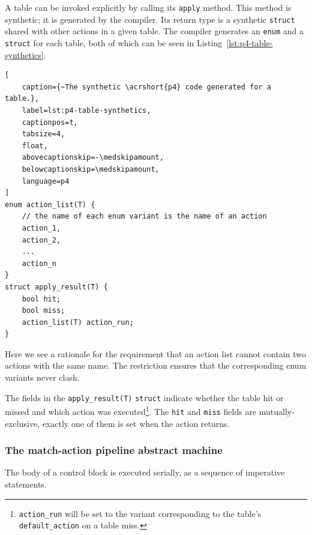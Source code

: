 A table can be invoked explicitly by calling its \texttt{apply} method. This
method is synthetic; it is generated by the compiler. Its return type is a
synthetic \texttt{struct} shared with other actions in a given table. The
compiler generates an \texttt{enum} and a \texttt{struct} for each table, both
of which can be seen in Listing~\ref{lst:p4-table-synthetics}.

\begin{lstlisting}[
	caption={~The synthetic \acrshort{p4} code generated for a table.},
	label=lst:p4-table-synthetics,
	captionpos=t,
	tabsize=4,
	float,
	abovecaptionskip=-\medskipamount,
	belowcaptionskip=\medskipamount,
	language=p4
]
enum action_list(T) {
	// the name of each enum variant is the name of an action
	action_1,
	action_2,
	...
	action_n
}
struct apply_result(T) {
	bool hit;
	bool miss;
	action_list(T) action_run;
}
\end{lstlisting}

Here we see a rationale for the requirement that an action list cannot contain
two actions with the same name. The restriction ensures that the corresponding
enum variants never clash.

The fields in the \texttt{apply\_result(T)} \texttt{struct} indicate whether the
table hit or missed and which action was executed\footnote{\texttt{action\_run}
will be set to the variant corresponding to the table's \texttt{default\_action}
on a table miss.}. The \texttt{hit} and \texttt{miss} fields are
mutually-exclusive, exactly one of them is set when the action returns.

\subsubsection*{The match-action pipeline abstract machine}

The body of a control block is executed serially, as a sequence of imperative
statements.
